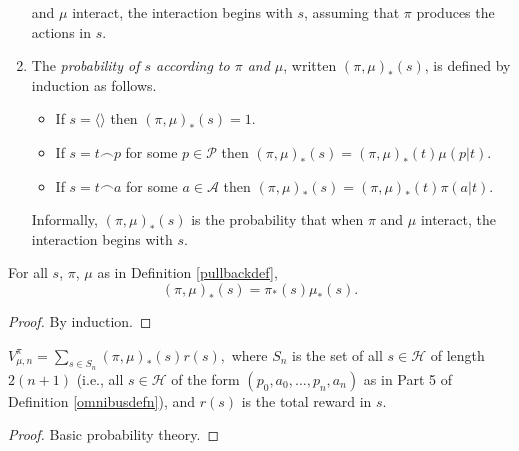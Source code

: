 \documentclass[runningheads]{llncs}
\begin{document}
\begin{definition}
\begin{enumerate}
        and $\mu$ interact, the interaction begins with $s$, assuming
        that $\pi$ produces the actions in $s$.
        \item
        The \emph{probability of $s$ according to $\pi$ and $\mu$},
        written $(\pi,\mu)_*(s)$, is defined by induction as follows.
        \begin{itemize}
            \item
            If $s=\langle\rangle$ then $(\pi,\mu)_*(s)=1$.
            \item
            If $s=t\frown p$ for some $p\in\mathcal P$ then
            $(\pi,\mu)_*(s)=(\pi,\mu)_*(t)\mu(p|t)$.
            \item
            If $s=t\frown a$ for some $a\in\mathcal A$ then
            $(\pi,\mu)_*(s)=(\pi,\mu)_*(t)\pi(a|t)$.
        \end{itemize}
        Informally, $(\pi,\mu)_*(s)$ is the probability that when $\pi$ and $\mu$
        interact, the interaction begins with $s$.
    \end{enumerate}
\end{definition}

\begin{lemma}
\label{factorizationlemma}
    For all $s$, $\pi$, $\mu$ as in Definition \ref{pullbackdef},
    \[
        (\pi,\mu)_*(s) = \pi_*(s)\mu_*(s).
    \]
\end{lemma}

\begin{proof}
    By induction.
\end{proof}

\begin{lemma}
\label{basicprobabilitylemma}
    $V^\pi_{\mu,n}=\sum_{s\in S_n}(\pi,\mu)_*(s)r(s),$
    where $S_n$ is the set of all $s\in\mathcal H$
    of length $2(n+1)$ (i.e., all $s\in\mathcal H$ of the form
    $(p_0,a_0,\ldots,p_n,a_n)$ as in Part 5 of Definition \ref{omnibusdefn}),
    and $r(s)$ is the total reward in $s$.
\end{lemma}

\begin{proof}
    Basic probability theory.
\end{proof}
\end{document}
